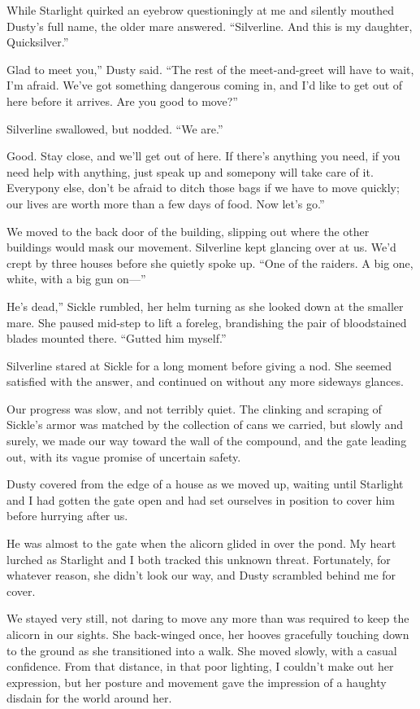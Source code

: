 While Starlight quirked an eyebrow questioningly at me and silently mouthed Dusty’s full name, the older mare answered. “Silverline. And this is my daughter, Quicksilver.”

\leavevmode{}Glad to meet you,” Dusty said. “The rest of the meet-and-greet will have to wait, I’m afraid. We’ve got something dangerous coming in, and I’d like to get out of here before it arrives. Are you good to move?”

Silverline swallowed, but nodded. “We are.”

\leavevmode{}Good. Stay close, and we’ll get out of here. If there’s anything you need, if you need help with anything, just speak up and somepony will take care of it. Everypony else, don’t be afraid to ditch those bags if we have to move quickly; our lives are worth more than a few days of food. Now let’s go.”

We moved to the back door of the building, slipping out where the other buildings would mask our movement. Silverline kept glancing over at us. We’d crept by three houses before she quietly spoke up. “One of the raiders. A big one, white, with a big gun on—”

\leavevmode{}He’s dead,” Sickle rumbled, her helm turning as she looked down at the smaller mare. She paused mid-step to lift a foreleg, brandishing the pair of bloodstained blades mounted there. “Gutted him myself.”

Silverline stared at Sickle for a long moment before giving a nod. She seemed satisfied with the answer, and continued on without any more sideways glances.

Our progress was slow, and not terribly quiet. The clinking and scraping of Sickle’s armor was matched by the collection of cans we carried, but slowly and surely, we made our way toward the wall of the compound, and the gate leading out, with its vague promise of uncertain safety.

Dusty covered from the edge of a house as we moved up, waiting until Starlight and I had gotten the gate open and had set ourselves in position to cover him before hurrying after us.

He was almost to the gate when the alicorn glided in over the pond. My heart lurched as Starlight and I both tracked this unknown threat. Fortunately, for whatever reason, she didn’t look our way, and Dusty scrambled behind me for cover.

We stayed very still, not daring to move any more than was required to keep the alicorn in our sights. She back-winged once, her hooves gracefully touching down to the ground as she transitioned into a walk. She moved slowly, with a casual confidence. From that distance, in that poor lighting, I couldn’t make out her expression, but her posture and movement gave the impression of a haughty disdain for the world around her.

